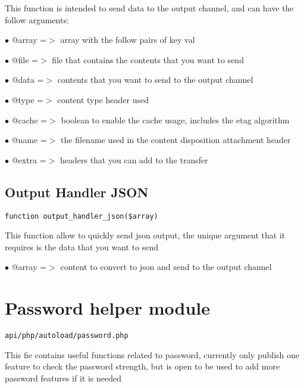 \documentclass[a4paper]{book}
\begin{document}
This function is intended to send data to the output channel, and can have
the follow arguments:

\begin{compactitem}
\item[\color{myblue}$\bullet$] @array =$>$ array with the follow pairs of key val
\item[\color{myblue}$\bullet$] @file  =$>$ file that contains the contents that you want to send
\item[\color{myblue}$\bullet$] @data  =$>$ contents that you want to send to the output channel
\item[\color{myblue}$\bullet$] @type  =$>$ content type header used
\item[\color{myblue}$\bullet$] @cache =$>$ boolean to enable the cache usage, includes the etag algorithm
\item[\color{myblue}$\bullet$] @name  =$>$ the filename used in the content disposition attachment header
\item[\color{myblue}$\bullet$] @extra =$>$ headers that you can add to the transfer
\end{compactitem}

\hypertarget{toc214}{}
\subsection{Output Handler JSON}

\begin{lstlisting}
function output_handler_json($array)
\end{lstlisting}

This function allow to quickly send json output, the unique argument that it
requires is the data that you want to send

\begin{compactitem}
\item[\color{myblue}$\bullet$] @array =$>$ content to convert to json and send to the output channel
\end{compactitem}

\hypertarget{toc215}{}
\section{Password helper module}

\begin{lstlisting}
api/php/autoload/password.php
\end{lstlisting}

This fie contains useful functions related to password, currently only publish one feature to check
the password strength, but is open to be used to add more password features if it is needed
\end{document}
